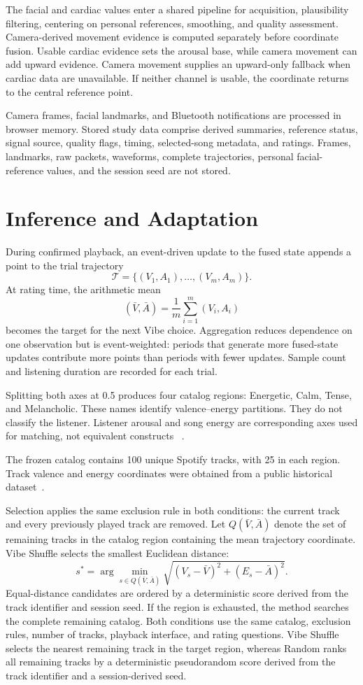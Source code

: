 The facial and cardiac values enter a shared pipeline for acquisition,
plausibility filtering, centering on personal references, smoothing, and quality
assessment. Camera-derived movement evidence is computed separately before
coordinate fusion. Usable
cardiac evidence sets the arousal base, while camera movement can add upward
evidence. Camera movement supplies an upward-only fallback when cardiac data
are unavailable. If neither channel is usable, the coordinate returns to the
central reference point.

Camera frames, facial landmarks, and Bluetooth notifications are processed in
browser memory. Stored study data comprise derived summaries, reference status,
signal source, quality flags, timing, selected-song metadata, and ratings.
Frames, landmarks, raw packets, waveforms, complete trajectories, personal
facial-reference values, and the session seed are not stored.

\section{Inference and Adaptation}
\label{sec:inference}

During confirmed playback, an event-driven update to the fused state appends a
point to the trial trajectory
\[
  \mathcal{T}=\{(V_1,A_1),\ldots,(V_m,A_m)\}.
\]
At rating time, the arithmetic mean
\[
  (\bar V,\bar A)=\frac{1}{m}\sum_{i=1}^{m}(V_i,A_i)
\]
becomes the target for the next Vibe choice. Aggregation reduces dependence on
one observation but is event-weighted: periods that generate more fused-state
updates contribute more points than periods with fewer updates. Sample count
and listening duration are recorded for each trial.

Splitting both axes at 0.5 produces four catalog regions: Energetic, Calm,
Tense, and Melancholic. These names identify valence--energy partitions. They
do not classify the listener. Listener arousal and song energy are
corresponding axes used for matching, not equivalent constructs
~\cite{helmholz2019,yang2012}.

The frozen catalog contains 100 unique Spotify tracks, with 25 in each region.
Track valence and energy coordinates were obtained from a public historical
dataset~\cite{spotifydataset}.

Selection applies the same exclusion rule in both conditions: the current track
and every previously played track are removed. Let $Q(\bar V,\bar A)$ denote the
set of remaining tracks in the catalog region containing the mean trajectory
coordinate. Vibe Shuffle selects the smallest Euclidean distance:
\[
 s^*=\arg\min_{s\in Q(\bar V,\bar A)}
 \sqrt{(V_s-\bar V)^2+(E_s-\bar A)^2}.
\]
Equal-distance candidates are ordered by a deterministic score derived from the
track identifier and session seed. If the region is exhausted, the method
searches the complete remaining catalog. Both conditions use the same catalog,
exclusion rules, number of tracks, playback interface, and rating questions.
Vibe Shuffle selects the nearest remaining track in the target region, whereas
Random ranks all remaining tracks by a deterministic pseudorandom score derived
from the track identifier and a session-derived seed.

